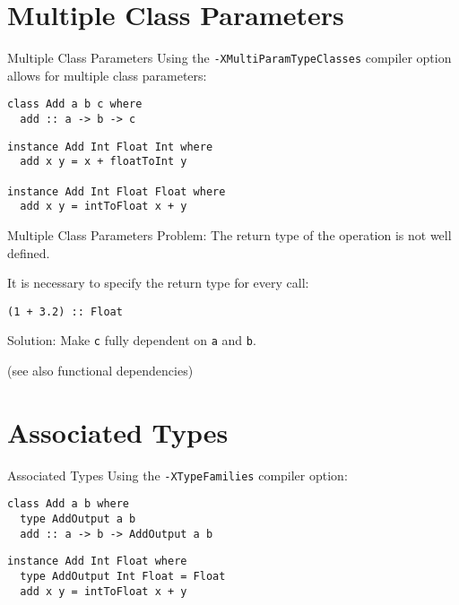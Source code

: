 \documentclass[
  english,            %
  aspectratio=169,    %
]{tumbeamer}
\begin{document}
\section{Multiple Class Parameters}

\begin{frame}[fragile]{Multiple Class Parameters}
Using the \verb|-XMultiParamTypeClasses| compiler option allows for multiple class parameters:
\begin{verbatim}
class Add a b c where
  add :: a -> b -> c
\end{verbatim}

\pause \vspace{6mm}

\begin{verbatim}
instance Add Int Float Int where
  add x y = x + floatToInt y

instance Add Int Float Float where
  add x y = intToFloat x + y
\end{verbatim}
\end{frame}

\begin{frame}[fragile]{Multiple Class Parameters}
Problem: The return type of the operation is not well defined.

\vspace{6mm}

It is necessary to specify the return type for every call:
\begin{verbatim}
(1 + 3.2) :: Float
\end{verbatim}

\vspace{3mm}

Solution: Make \verb|c| fully dependent on \verb|a| and \verb|b|.

(see also functional dependencies)
\end{frame}

\section{Associated Types}

\begin{frame}[fragile]{Associated Types}
Using the \verb|-XTypeFamilies| compiler option:
\begin{verbatim}
class Add a b where
  type AddOutput a b
  add :: a -> b -> AddOutput a b
\end{verbatim}

\pause \vspace{6mm}

\begin{verbatim}
instance Add Int Float where
  type AddOutput Int Float = Float
  add x y = intToFloat x + y
\end{verbatim}
\end{frame}
\end{document}

